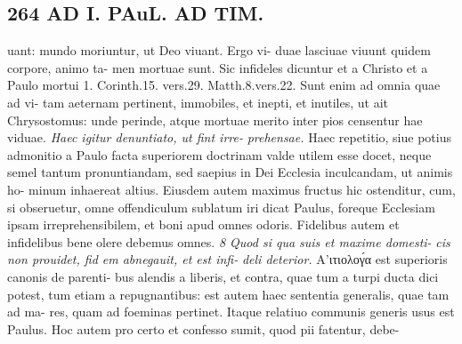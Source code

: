 \documentclass{article}
\begin{document}
\begin{pages}
\section*{264 AD I. PAuL. AD TIM. }uant: mundo moriuntur, ut Deo viuant. Ergo vi- duae lasciuae viuunt quidem corpore, animo ta- men mortuae sunt. Sic infideles dicuntur et a Christo et a Paulo mortui 1. Corinth.15. vers.29. Matth.8.vers.22. Sunt enim ad omnia quae ad vi- tam aeternam pertinent, immobiles, et inepti, et inutiles, ut ait Chrysostomus: unde perinde, atque mortuae merito inter pios censentur hae viduae. \textit{Haec igitur denuntiato, ut fint irre-} \textit{prehensae.} Haec repetitio, siue potius admonitio a Paulo facta superiorem doctrinam valde utilem esse docet, neque semel tantum pronuntiandam, sed saepius in Dei Ecclesia inculcandam, ut animis ho- minum inhaereat altius. Eiusdem autem maximus fructus hic ostenditur, cum, si obseruetur, omne offendiculum sublatum iri dicat Paulus, foreque Ecclesiam ipsam irreprehensibilem, et boni apud omnes odoris. Fidelibus autem et infidelibus bene olere debemus omnes. \textit{8 Quod si qua suis et maxime domesti-} \textit{cis non prouidet, fid em abnegauit, et est infi-} \textit{deli deterior.} Α’ιτιολογ́α est superioris canonis de parenti- bus alendis a liberis, et contra, quae tum a turpi ducta dici potest, tum etiam a repugnantibus: est autem haec sententia generalis, quae tam ad ma- res, quam ad foeminas pertinet. Itaque relatiuo communis generis usus est Paulus. Hoc autem pro certo et confesso sumit, quod pii fatentur, debe- 

\end{pages}
\end{document}
